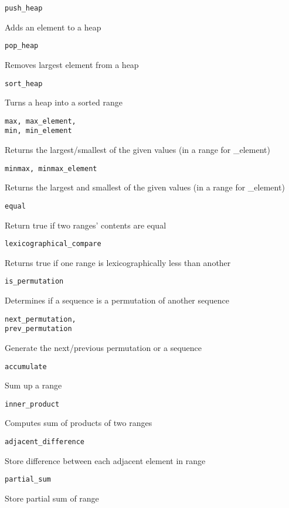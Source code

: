 \begin{multicols}{2}
\begin{lstlisting}
push_heap
\end{lstlisting}
Adds an element to a heap
\begin{lstlisting}
pop_heap
\end{lstlisting}
Removes largest element from a heap
\begin{lstlisting}
sort_heap
\end{lstlisting}
Turns a heap into a sorted range
\begin{lstlisting}
max, max_element,
min, min_element
\end{lstlisting}
Returns the largest/smallest of the given values (in a range for \_element)
\begin{lstlisting}
minmax, minmax_element
\end{lstlisting}
Returns the largest and smallest of the given values (in a range for \_element)
\begin{lstlisting}
equal
\end{lstlisting}
Return true if two ranges' contents are equal
\begin{lstlisting}
lexicographical_compare
\end{lstlisting}
Returns true if one range is lexicographically less than another
\begin{lstlisting}
is_permutation
\end{lstlisting}
Determines if a sequence is a permutation of another sequence
\begin{lstlisting}
next_permutation,
prev_permutation
\end{lstlisting}
Generate the next/previous permutation or a sequence
\begin{lstlisting}
accumulate
\end{lstlisting}
Sum up a range
\begin{lstlisting}
inner_product
\end{lstlisting}
Computes sum of products of two ranges
\begin{lstlisting}
adjacent_difference
\end{lstlisting}
Store difference between each adjacent element in range
\begin{lstlisting}
partial_sum
\end{lstlisting}
Store partial sum of range



\end{multicols}

\endgroup

